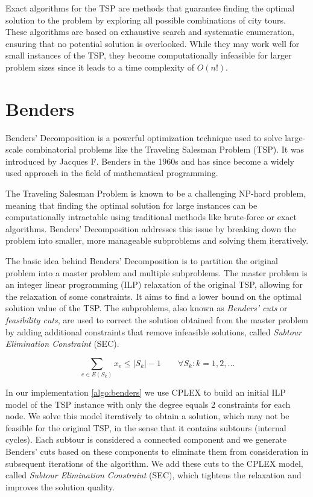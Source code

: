 Exact algorithms for the TSP are methods that guarantee finding the optimal solution to the problem by exploring all possible combinations of city tours. These algorithms are based on exhaustive search and systematic enumeration, ensuring that no potential solution is overlooked. While they may work well for small instances of the TSP, they become computationally infeasible for larger problem sizes since it leads to a time complexity of $O(n!)$.


\section{Benders}
Benders' Decomposition is a powerful optimization technique used to solve large-scale combinatorial problems like the Traveling Salesman Problem (TSP). It was introduced by Jacques F. Benders in the 1960s and has since become a widely used approach in the field of mathematical programming.

The Traveling Salesman Problem is known to be a challenging NP-hard problem, meaning that finding the optimal solution for large instances can be computationally intractable using traditional methods like brute-force or exact algorithms. Benders' Decomposition addresses this issue by breaking down the problem into smaller, more manageable subproblems and solving them iteratively.

The basic idea behind Benders' Decomposition is to partition the original problem into a master problem and multiple subproblems. The master problem is an integer linear programming (ILP) relaxation of the original TSP, allowing for the relaxation of some constraints. It aims to find a lower bound on the optimal solution value of the TSP. The subproblems, also known as \textit{Benders' cuts} or \textit{feasibility cuts}, are used to correct the solution obtained from the master problem by adding additional constraints that remove infeasible solutions, called \textit{Subtour Elimination Constraint} (SEC).

\begin{equation*}
    \sum_{e \in E(S_k)} x_e \leq |S_k|-1 \quad \quad \forall S_k: k=1,2,...
\end{equation*}

In our implementation \ref{algo:benders} we use CPLEX to build an initial ILP model of the TSP instance with only the degree equals 2 constraints for each node. We solve this model iteratively to obtain a solution,  which may not be feasible for the original TSP, in the sense that it contains subtours (internal cycles). Each subtour is considered a connected component and we generate Benders' cuts based on these components to eliminate them from consideration in subsequent iterations of the algorithm. We add these cuts to the CPLEX model, called \textit{Subtour Elimination Constraint} (SEC), which tightens the relaxation and improves the solution quality.



